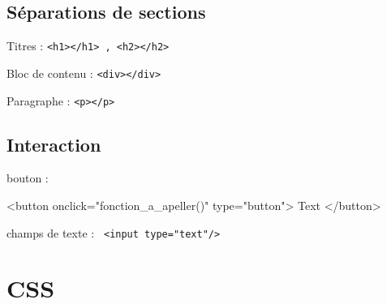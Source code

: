 \documentclass[10pt, french]{article}
\newcommand{\codeHTMLinline}[2] {
	#1 : \texttt{#2}
  }
\newenvironment{codeHTML}[1]{%
#1 :  %
\minted{HTML}%
}{%
\endminted%
}
\begin{document}
\subsection{Séparations de sections}
\codeHTMLinline{Titres}{<h1></h1> , <h2></h2>}
\codeHTMLinline{Bloc de contenu}{<div></div>}
\codeHTMLinline{Paragraphe}{<p></p>}

\subsection{Interaction}
\begin{codeHTML}{bouton}
<button onclick="fonction_a_apeller()" type="button">
	Text
</button>
\end{codeHTML}
\codeHTMLinline{champs de texte}{	<input type="text"/>}


		\section{CSS}
    
    
\end{document}

